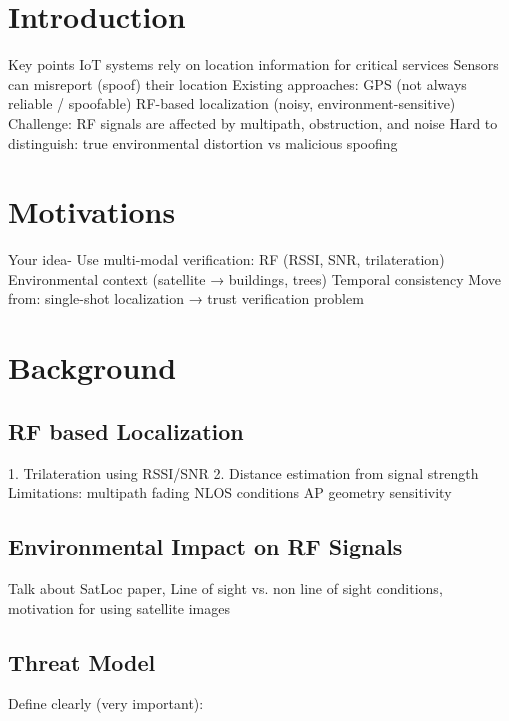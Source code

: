 \documentclass[10pt, twocolumn, letterpaper]{article}
\title{}
\author{Vayun Gupta \\ University of Illinois Urbana-Champaign}
\begin{document}
\maketitle

\begin{abstract}

\end{abstract}

\section{Introduction}
Key points
IoT systems rely on location information for critical services
Sensors can misreport (spoof) their location
Existing approaches:
GPS (not always reliable / spoofable)
RF-based localization (noisy, environment-sensitive)
Challenge:
RF signals are affected by multipath, obstruction, and noise
Hard to distinguish:
true environmental distortion vs malicious spoofing

\section{Motivations}

Your idea-
Use multi-modal verification:
RF (RSSI, SNR, trilateration)
Environmental context (satellite → buildings, trees)
Temporal consistency
Move from:
single-shot localization → trust verification problem


\section{Background}

\subsection{RF based Localization}
1. Trilateration using RSSI/SNR
2. Distance estimation from signal strength
Limitations:
multipath fading
NLOS conditions
AP geometry sensitivity

\subsection{Environmental Impact on RF Signals}
Talk about SatLoc paper, Line of sight vs. non line of sight conditions, motivation for using satellite images


\subsection{Threat Model
}
Define clearly (very important):
\end{document}
